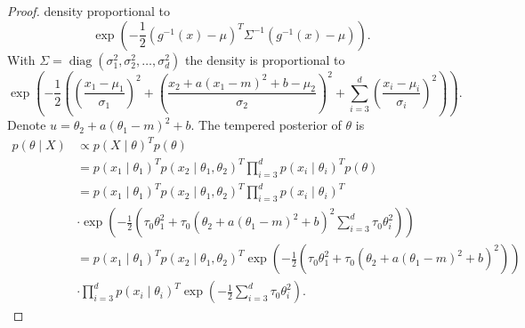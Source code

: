 \documentclass[english,twoside,openright]{HYgraduMLDS}
\DeclareMathOperator{\diag}{diag}
\begin{document}
\begin{appendices}
\begin{proof}
  density proportional to
  \[
    \exp\left(-\frac{1}{2}(g^{-1}(x) - \mu)^T\Sigma^{-1}(g^{-1}(x) - \mu)\right).
  \]
  With \(\Sigma = \diag(\sigma_1^2, \sigma_2^2, \dotsc,\sigma_{d}^{2})\) the
  density is proportional to
  \[
    \exp
    \left(-\frac{1}{2}\left(\left(\frac{x_1 - \mu_1}{\sigma_1}\right)^2
        + \left(\frac{x_2 + a(x_1 - m)^2 + b - \mu_2}{\sigma_2}\right)^2
        + \sum_{i=3}^d\left(\frac{x_i - \mu_i}{\sigma_i}\right)^2\right)\right).
  \]
  Denote \(u = \theta_2 + a(\theta_1 - m)^2 + b\).
  The tempered posterior of \(\theta\) is
  \begin{align*}
    p(\theta\mid X) &\propto p(X\mid \theta)^Tp(\theta)
    \\&= p(x_1\mid \theta_1)^Tp(x_2\mid \theta_1, \theta_2)^T
    \prod_{i=3}^d p(x_i\mid \theta_i)^T p(\theta)
    \\&= p(x_1\mid \theta_1)^Tp(x_2\mid \theta_1, \theta_2)^T
    \prod_{i=3}^d p(x_i\mid \theta_i)^T
    \\&\cdot \exp\left(-\frac{1}{2}\left(\tau_0\theta_1^2
    + \tau_0(\theta_2 + a(\theta_1 - m)^2 + b)^2
    \sum_{i=3}^d \tau_0\theta_i^2\right)\right)
    \\&= p(x_1\mid \theta_1)^Tp(x_2\mid \theta_1, \theta_2)^T
    \exp\left(-\frac{1}{2}\left(\tau_0\theta_1^2
    + \tau_0(\theta_2 + a(\theta_1 - m)^2 + b)^2\right)\right)
    \\&\cdot \prod_{i=3}^d p(x_i\mid \theta_i)^T
    \exp\left(-\frac{1}{2}\sum_{i=3}^d \tau_0\theta_i^2\right).
  \end{align*}


\end{proof}
\end{appendices}
\end{document}
